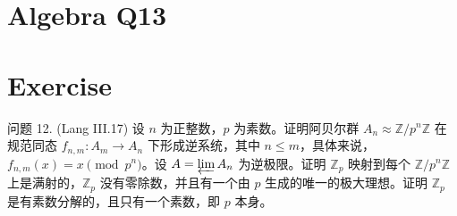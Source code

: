 \documentclass[12pt]{book}
\begin{document}
\section{Algebra Q13}
\section*{Exercise}
问题 12. (Lang III.17) 设 $n$ 为正整数，$p$ 为素数。证明阿贝尔群 $A_n \approx \mathbb{Z}/p^n\mathbb{Z}$ 在规范同态 $f_{n,m}: A_m \to A_n$ 下形成逆系统，其中 $n \le m$，具体来说，$f_{n,m}(x) = x \pmod{p^n}$。设 $A = \varprojlim A_n$ 为逆极限。证明 $\mathbb{Z}_p$ 映射到每个 $\mathbb{Z}/p^n\mathbb{Z}$ 上是满射的，$\mathbb{Z}_p$ 没有零除数，并且有一个由 $p$ 生成的唯一的极大理想。证明 $\mathbb{Z}_p$ 是有素数分解的，且只有一个素数，即 $p$ 本身。
\end{document}

